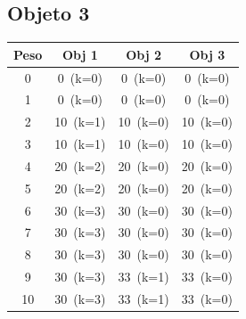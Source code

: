 \documentclass[12pt]{article}
\begin{document}
\subsection*{Objeto 3}
\begin{longtable}{cccc}
\toprule
Peso & Obj 1 & Obj 2 & Obj 3 \\
\midrule
0 & \cellcolor{red!20}0~(k=0) & \cellcolor{red!20}0~(k=0) & \cellcolor{red!20}0~(k=0) \\
1 & \cellcolor{red!20}0~(k=0) & \cellcolor{red!20}0~(k=0) & \cellcolor{red!20}0~(k=0) \\
2 & \cellcolor{green!40}10~(k=1) & \cellcolor{red!20}10~(k=0) & \cellcolor{red!20}10~(k=0) \\
3 & \cellcolor{green!40}10~(k=1) & \cellcolor{red!20}10~(k=0) & \cellcolor{red!20}10~(k=0) \\
4 & \cellcolor{green!40}20~(k=2) & \cellcolor{red!20}20~(k=0) & \cellcolor{red!20}20~(k=0) \\
5 & \cellcolor{green!40}20~(k=2) & \cellcolor{red!20}20~(k=0) & \cellcolor{red!20}20~(k=0) \\
6 & \cellcolor{green!40}30~(k=3) & \cellcolor{red!20}30~(k=0) & \cellcolor{red!20}30~(k=0) \\
7 & \cellcolor{green!40}30~(k=3) & \cellcolor{red!20}30~(k=0) & \cellcolor{red!20}30~(k=0) \\
8 & \cellcolor{green!40}30~(k=3) & \cellcolor{red!20}30~(k=0) & \cellcolor{red!20}30~(k=0) \\
9 & \cellcolor{green!40}30~(k=3) & \cellcolor{green!40}33~(k=1) & \cellcolor{red!20}33~(k=0) \\
10 & \cellcolor{green!40}30~(k=3) & \cellcolor{green!40}33~(k=1) & \cellcolor{red!20}33~(k=0) \\
\bottomrule
\end{longtable}
\end{document}
